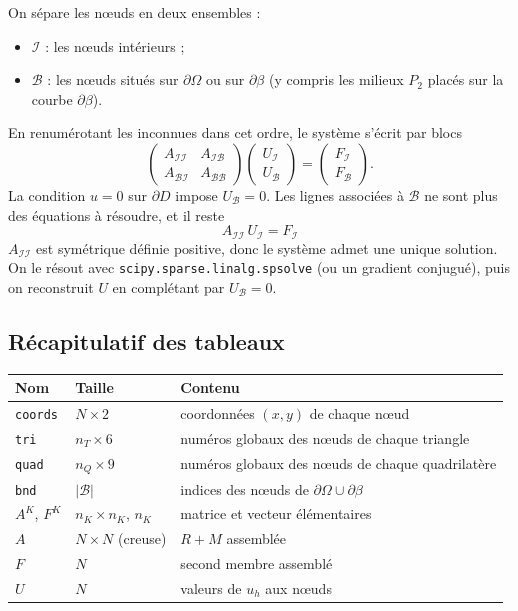 \documentclass[11pt,a4paper]{article}
\begin{document}
On sépare les nœuds en deux ensembles :
\begin{itemize}
  \item $\mathcal{I}$ : les nœuds intérieurs ;
  \item $\mathcal{B}$ : les nœuds situés sur $\partial\Omega$ ou sur
        $\partial\beta$ (y compris les milieux $P_2$ placés sur la courbe
        $\partial\beta$).
\end{itemize}
En renumérotant les inconnues dans cet ordre, le système s'écrit par blocs
\[
\begin{pmatrix}
A_{\mathcal{I}\mathcal{I}} & A_{\mathcal{I}\mathcal{B}} \\
A_{\mathcal{B}\mathcal{I}} & A_{\mathcal{B}\mathcal{B}}
\end{pmatrix}
\begin{pmatrix} U_{\mathcal{I}} \\ U_{\mathcal{B}} \end{pmatrix}
=
\begin{pmatrix} F_{\mathcal{I}} \\ F_{\mathcal{B}} \end{pmatrix}.
\]
La condition $u = 0$ sur $\partial D$ impose $U_{\mathcal{B}} = 0$. Les
lignes associées à $\mathcal{B}$ ne sont plus des équations à résoudre, et
il reste
\[
\boxed{\ A_{\mathcal{I}\mathcal{I}}\, U_{\mathcal{I}} = F_{\mathcal{I}}\ }
\]
$A_{\mathcal{I}\mathcal{I}}$ est symétrique définie positive, donc le système
admet une unique solution. On le résout avec
\texttt{scipy.sparse.linalg.spsolve} (ou un gradient conjugué), puis on
reconstruit $U$ en complétant par $U_{\mathcal{B}} = 0$.

\subsection{Récapitulatif des tableaux}

\begin{center}
\begin{tabular}{lll}
\hline
Nom & Taille & Contenu \\
\hline
\texttt{coords} & $N \times 2$ & coordonnées $(x,y)$ de chaque nœud \\
\texttt{tri}    & $n_T \times 6$ & numéros globaux des nœuds de chaque triangle \\
\texttt{quad}   & $n_Q \times 9$ & numéros globaux des nœuds de chaque quadrilatère \\
\texttt{bnd}    & $|\mathcal{B}|$ & indices des nœuds de $\partial\Omega \cup \partial\beta$ \\
$A^K$, $F^K$    & $n_K \times n_K$, $n_K$ & matrice et vecteur élémentaires \\
$A$             & $N \times N$ (creuse) & $R + M$ assemblée \\
$F$             & $N$ & second membre assemblé \\
$U$             & $N$ & valeurs de $u_h$ aux nœuds \\
\hline
\end{tabular}
\end{center}
\end{document}
